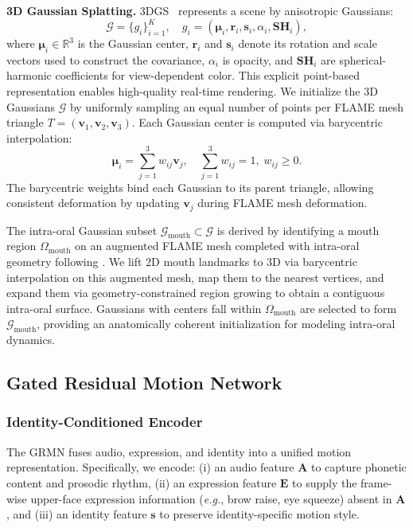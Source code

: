 \noindent \textbf{3D Gaussian Splatting.}
3DGS~\cite{kerbl20233d} represents a scene by anisotropic Gaussians:
\begin{equation}
\mathcal{G}=\{g_i\}_{i=1}^{K},\quad
g_i=(\boldsymbol{\mu}_i,\boldsymbol{r}_i,\boldsymbol{s}_i,\alpha_i,\mathbf{SH}_i),
\label{eq:gauss-def}
\end{equation}
where $\boldsymbol{\mu}_i\in\mathbb{R}^3$ is the Gaussian center, $\boldsymbol{r}_i$ and $\boldsymbol{s}_i$ denote its rotation and scale vectors used to construct the covariance, $\alpha_i$ is opacity, and $\mathbf{SH}_i$ are spherical-harmonic coefficients for view-dependent color. This explicit point-based representation enables high-quality real-time rendering. We initialize the 3D Gaussians $\mathcal{G}$ by uniformly sampling an equal number of points per FLAME mesh triangle \(T=(\mathbf{v}_1,\mathbf{v}_2,\mathbf{v}_3)\). Each Gaussian center is computed via barycentric interpolation:
\begin{equation}
\boldsymbol{\mu}_i = \sum_{j=1}^{3} w_{ij}\mathbf{v}_j,\quad 
\sum_{j=1}^{3}w_{ij}=1,\; w_{ij}\ge0.
\end{equation}
The barycentric weights bind each Gaussian to its parent triangle, allowing consistent deformation by updating $\mathbf{v}_j$ during FLAME mesh deformation.

The intra-oral Gaussian subset $\mathcal{G}_{\text{mouth}}\!\subset\!\mathcal{G}$ is derived by identifying a mouth region \(\Omega_{\text{mouth}}\) on an augmented FLAME mesh completed with intra-oral geometry following \cite{qian2024gaussianavatars}. We lift 2D mouth landmarks to 3D via barycentric interpolation on this augmented mesh, map them to the nearest vertices, and expand them via geometry-constrained region growing to obtain a contiguous intra-oral surface. Gaussians with centers fall within \(\Omega_{\text{mouth}}\) are selected to form \(\mathcal{G}_{\text{mouth}}\), providing an anatomically coherent initialization for modeling intra-oral dynamics.

\subsection{Gated Residual Motion Network}

\subsubsection{Identity-Conditioned Encoder}
\label{sec:encoder}
The GRMN fuses audio, expression, and identity into a unified motion representation. Specifically, we encode:
(i) an audio feature $\mathbf{A}$ to capture phonetic content and prosodic rhythm, 
(ii) an expression feature $\mathbf{E}$ to supply the frame-wise upper-face expression information (\textit{e.g.}, brow raise, eye squeeze) absent in $\mathbf{A}$, and
(iii) an identity feature $\mathbf{s}$ to preserve identity-specific motion style.

